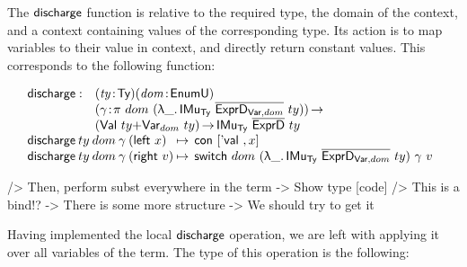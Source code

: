 The $\discharge$ function is relative to the required type, the domain
of the context, and a context containing values of the corresponding
type. Its action is to map variables to their value in context, and
directly return constant values. This corresponds to the following
function:

\[\stk{
\begin{array}{@{}ll}
\discharge : & \PITEL{\V{ty}}{\Ty}
               \PITEL{\V{dom}}{\EnumU} \\
             & \PI{\V{\gamma}}{\spi{dom}{(\LAM{\_} \IMu{\Ty}{\toIDesc{\HExprVarD{dom}}}{ty})}} \\
             & (\SUM{\Val{ty}}{\Var{dom}{ty}}) \To
               \IMu{\Ty}{\toIDesc{\HExprD}}{ty} 
\end{array} \\
\begin{array}{@{}l@{\:\mapsto\:\:}l}
\discharge\: ty\: dom\: \gamma\: (\SumLeft x)  & \Con{\pair{\Eval{}}{x}{}} \\
\discharge\: ty\: dom\: \gamma\: (\SumRight v) & \switch{dom}{(\LAM{\_} \IMu{\Ty}{\toIDesc{\HExprVarD{dom}}}{ty})}{\gamma}{v}
\end{array}
}\]

\begin{wstructure}
            /> Then, perform subst everywhere in the term
                -> Show type [code]
                /> This is a bind!?
                -> There is some more structure 
                    -> We should try to get it
\end{wstructure}

Having implemented the local $\discharge$ operation, we are left with
applying it over all variables of the term. The type of this operation
is the following:

\newcommand{\substH}{\F{substExpr}}
\newcommand{\domNat}{dom_{\CN{nat}}}
\newcommand{\domBool}{dom_{\CN{bool}}}
\newcommand{\gammaNat}{\gamma_{\CN{nat}}}
\newcommand{\gammaBool}{\gamma_{\CN{bool}}}

